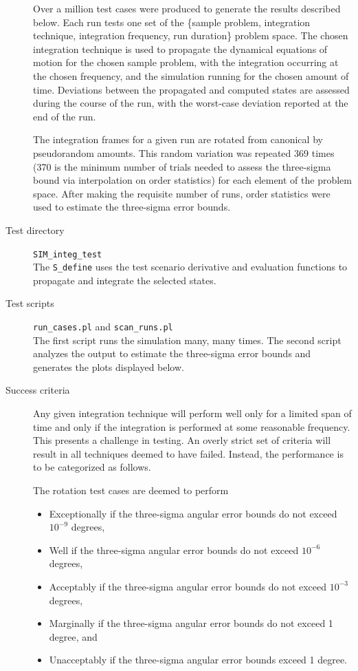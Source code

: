 \begin{description}
Over a million test cases were produced to generate the results
described below.
Each run tests one set of the \{sample problem, integration technique,
integration frequency, run duration\} problem space.
The chosen integration technique is used to propagate
the dynamical equations of motion for the chosen sample problem,
with the integration occurring at the chosen frequency, and
the simulation running for the chosen amount of time.
Deviations between the propagated and computed states are
assessed during the course of the run, with
the worst-case deviation reported at the end of the run.

The integration frames for a given run are rotated from canonical by
pseudorandom amounts. This random variation was repeated 369 times (370 is
the minimum number of trials needed to assess the three-sigma bound
via interpolation on order statistics)
for each element of the problem space. After making the requisite number of
runs, order statistics were used to estimate the three-sigma error bounds.

\item[Test directory] {\tt SIM\_integ\_test} \\
The {\tt S\_define} uses the test scenario derivative and evaluation 
functions to propagate and integrate the selected states.
\item[Test scripts] {\tt run\_cases.pl} and {\tt scan\_runs.pl} \\
The first script runs the simulation many, many times. The second
script analyzes the output to estimate the three-sigma error bounds and
generates the plots displayed below.

\item[Success criteria] Any given integration technique will perform well
only for a limited span of time and only if the integration is performed
at some reasonable frequency. This presents a challenge in testing.
An overly strict set of criteria will result in all techniques deemed to
have failed. Instead, the performance is to be categorized as follows. 

The rotation test cases are deemed to perform
\begin{itemize}
\item Exceptionally if the three-sigma angular error bounds
  do not exceed $10^{-9}$ degrees,
\item Well if the three-sigma angular error bounds
  do not exceed $10^{-6}$ degrees,
\item Acceptably if the three-sigma angular error bounds
  do not exceed $10^{-3}$ degrees,
\item Marginally if the three-sigma angular error bounds
  do not exceed 1 degree, and
\item Unacceptably if the three-sigma angular error bounds
  exceed 1 degree.
\end{itemize}


\end{description}
